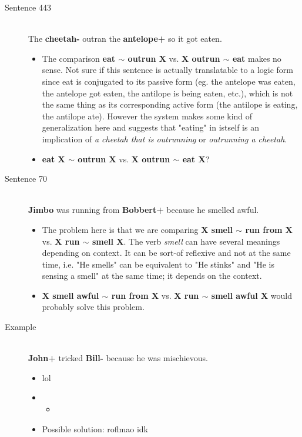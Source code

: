 \documentclass{article}
\newcommand{\insertcode}[2]{\begin{itemize}\item[]\end{itemize}} %
\begin{document}
\begin{description}
  \item[Sentence 443] \hfill \\
  The {\bf cheetah-} outran the {\bf antelope+} so it got eaten.
  \begin{itemize}
  	\item The comparison {\bf eat $\sim$ outrun X} vs. {\bf X outrun $\sim$ eat} makes no sense. Not sure if this sentence is actually translatable to a logic form since eat is conjugated to its passive form (eg. the antelope was eaten, the antelope got eaten, the antilope is being eaten, etc.), which is not the same thing as its corresponding active form (the antilope is eating, the antilope ate). However the system makes some kind of generalization here and suggests that "eating" in istself is an implication of {\it a cheetah that is outrunning} or {\it outrunning a cheetah}.
  	\item {\bf eat X $\sim$ outrun X} vs. {\bf X outrun $\sim$ eat X}?
  \end{itemize}

  \item[Sentence 70] \hfill \\
  {\bf Jimbo} was running from {\bf Bobbert+} because he smelled awful.
  \begin{itemize}
  	\item The problem here is that we are comparing {\bf X smell $\sim$ run from X} vs. {\bf X run $\sim$ smell X}. The verb {\it smell} can have several meanings depending on context. It can be sort-of reflexive and not at the same time, i.e. "He smells" can be equivalent to "He stinks" and "He is sensing a smell" at the same time; it depends on the context. 
  	\item {\bf X smell awful $\sim$ run from X} vs. {\bf X run $\sim$ smell awful X} would probably solve this problem.
  \end{itemize}

  \item[Example] \hfill \\
  {\bf John+} tricked {\bf Bill-} because he was mischievous.
  \begin{itemize}
  	\item lol
  	\item \insertcode{"Scripts/example.pl"}{Example}
  	\item Possible solution: roflmao idk
  \end{itemize}
  

  

\end{description}

\end{document}
